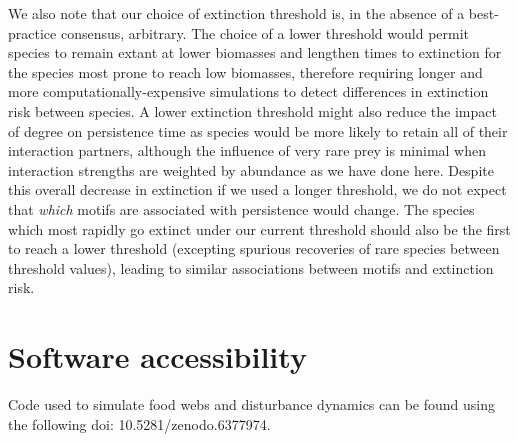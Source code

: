 \documentclass[12pt]{article}
\begin{document}
\begin{spacing}{1.0}
        
        We also note that our choice of extinction threshold is, in the absence of a best-practice consensus, arbitrary.
        The choice of a lower threshold would permit species to remain extant at lower biomasses and lengthen times to extinction for the species most prone to reach low biomasses, therefore requiring longer and more computationally-expensive simulations  to detect differences in extinction risk between species.
        A lower extinction threshold might also reduce the impact of degree on persistence time as species would be more likely to retain all of their interaction partners, although the influence of very rare prey is minimal when interaction strengths are weighted by abundance as we have done here.
        Despite this overall decrease in extinction if we used a longer threshold,  we do not expect that \emph{which} motifs are associated with persistence would change.
        The species which most rapidly go extinct under our current threshold should also be the first to reach a lower threshold (excepting spurious recoveries of rare species between threshold values), leading to similar associations between motifs and extinction risk.


\section*{Software accessibility}

    Code used to simulate food webs and disturbance dynamics can be found using the following doi: 10.5281/zenodo.6377974.





\clearpage
     

\clearpage
\end{spacing}

\clearpage

\end{document}
